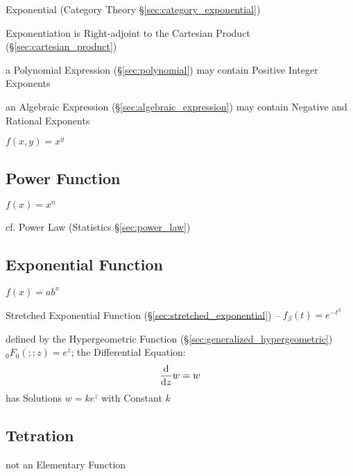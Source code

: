 \fist Exponential (Category Theory \S\ref{sec:category_exponential})

Exponentiation is Right-adjoint to the Cartesian Product
(\S\ref{sec:cartesian_product})

a Polynomial Expression (\S\ref{sec:polynomial}) may contain
Positive Integer Exponents

an Algebraic Expression (\S\ref{sec:algebraic_expression}) may contain Negative
and Rational Exponents

$f(x,y) = x^y$



\subsection{Power Function}\label{sec:power_function}

$f(x) = x^n$

cf. Power Law (Statistics \S\ref{sec:power_law})



\subsection{Exponential Function}\label{sec:exponential_function}

$f(x) = ab^x$

Stretched Exponential Function (\S\ref{sec:stretched_exponential})
-- $f_\beta(t) = e^{-t^\beta}$

defined by the Hypergeometric Function (\S\ref{sec:generalized_hypergeometric})
$_0F_0(;;z) = e^z$; the Differential Equation:
\[
  \frac{\mathrm{d}}{\mathrm{d}z} w = w
\]
has Solutions $w = k e^z$ with Constant $k$



\subsection{Tetration}\label{sec:tetration}

not an Elementary Function



